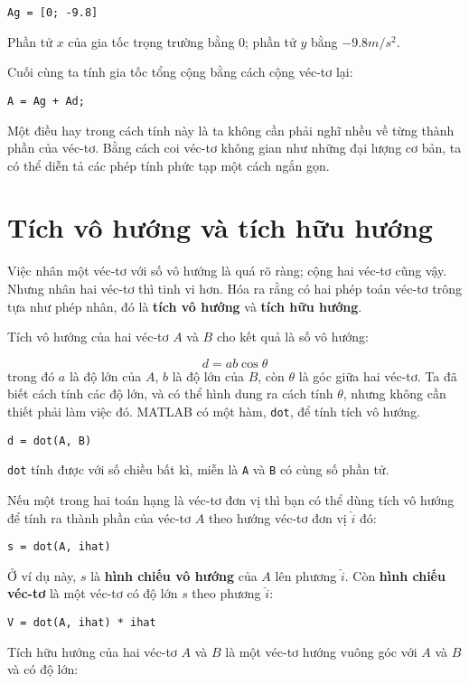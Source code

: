 \documentclass[12pt]{book}
\begin{document}
\begin{verbatim}
Ag = [0; -9.8]
\end{verbatim}
%
Phần tử  $x$ của gia tốc trọng trường bằng 0; phần tử $y$ bằng $-9.8 m/s^2$.

Cuối cùng ta tính gia tốc tổng cộng bằng cách cộng véc-tơ lại:

\begin{verbatim}
A = Ag + Ad;
\end{verbatim}
%
Một điều hay trong cách tính này là ta không cần phải nghĩ nhều về từng 
thành phần của véc-tơ. Bằng cách coi véc-tơ không gian như những đại lượng 
cơ bản, ta có thể diễn tả các phép tính phức tạp một cách ngắn gọn.


\section{Tích vô hướng và tích hữu hướng}

Việc nhân một véc-tơ với số vô hướng là quá rõ ràng; cộng hai véc-tơ cũng vậy. 
Nhưng nhân hai véc-tơ thì tinh vi hơn. Hóa ra rằng có hai phép toán véc-tơ 
trông tựa như phép nhân, đó là {\bf tích vô hướng} và {\bf tích hữu hướng}.

Tích vô hướng của hai véc-tơ $A$ và $B$ cho kết quả là số vô hướng:

\[ d = a b \cos \theta \]
%
trong đó $a$ là độ lớn của $A$, $b$ là độ lớn của $B$, còn 
$\theta$ là góc giữa hai véc-tơ. Ta đã biết cách tính các độ lớn, và có thể 
hình dung ra cách tính $\theta$, nhưng không cần thiết phải làm việc đó.  
MATLAB có một hàm, {\tt dot}, để tính tích vô hướng.

\begin{verbatim}
d = dot(A, B)
\end{verbatim}
%
{\tt dot} tính được với số chiều bất kì, miễn là {\tt A} và {\tt B} có cùng 
số phần tử.

Nếu một trong hai toán hạng là véc-tơ đơn vị thì bạn có thể dùng tích 
vô hướng để tính ra thành phần của véc-tơ $A$ theo hướng véc-tơ đơn vị 
$\hat{i}$ đó:

\begin{verbatim}
s = dot(A, ihat)
\end{verbatim}
%
Ở ví dụ này, $s$ là {\bf hình chiếu vô hướng} của $A$
lên phương $\hat{i}$. Còn {\bf hình chiếu véc-tơ} là một véc-tơ 
có độ lớn $s$ theo phương $\hat{i}$:

\begin{verbatim}
V = dot(A, ihat) * ihat
\end{verbatim}
%
Tích hữu hướng của hai véc-tơ $A$ và $B$ là một véc-tơ hướng 
vuông góc với $A$ và $B$ và có độ lớn:
\end{document}
